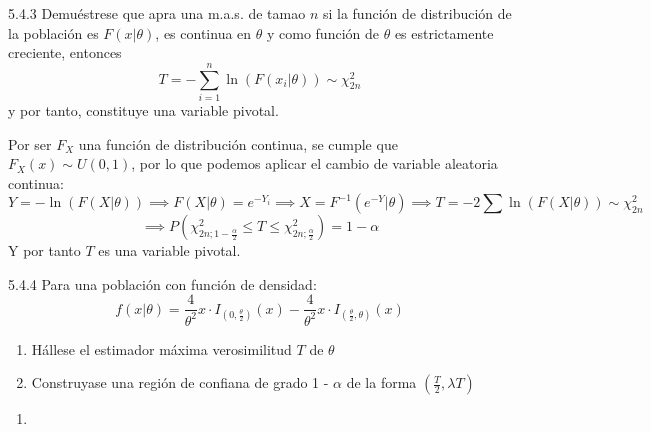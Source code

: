 \begin{problem}{5.4.3}
    Demuéstrese que apra una m.a.s. de tamao $n$ si la función de distribución de la población es $F(x | \theta)$, es continua en $\theta$ y como función de $\theta$ es estrictamente creciente, entonces
    $$T = -\sum_{i=1}^{n} \ln(F(x_i | \theta)) \sim \chi^2_{2n}$$
    y por tanto, constituye una variable pivotal.
\end{problem}
\begin{sol}
    Por ser $F_X$ una función de distribución continua, se cumple que $F_X(x) \sim U(0,1)$, por lo que podemos aplicar el cambio de variable aleatoria continua:
    $$Y = -\ln(F(X | \theta)) \implies F(X | \theta) = e^{-Y_i} \implies X = F^{-1}(e^{-Y} | \theta) \implies T = -2\sum \ln(F(X | \theta)) \sim \chi^2_{2n}$$
    $$\implies P\left(\chi^2_{2n; 1 - \frac{\alpha}{2}} \leq T \leq \chi^2_{2n; \frac{\alpha}{2}}\right) = 1 - \alpha$$
    Y por tanto $T$ es una variable pivotal. 
\end{sol}
\begin{problem}{5.4.4}
    Para una población con función de densidad: 
    $$f(x | \theta) = \frac{4}{\theta^2}x \cdot I_{(0, \frac{\theta}{2})}(x) - \frac{4}{\theta^2}x \cdot I_{(\frac{\theta}{2}, \theta)}(x)$$
    \begin{enumerate}
        \item Hállese el estimador máxima verosimilitud $T$ de $\theta$ 
        \item Construyase una región de confiana de grado 1 - $\alpha$ de la forma $(\frac{T}{2}, \lambda T)$
    \end{enumerate}
\end{problem}
\begin{sol}
    \begin{enumerate}
        \item 
    \end{enumerate}
\end{sol}
